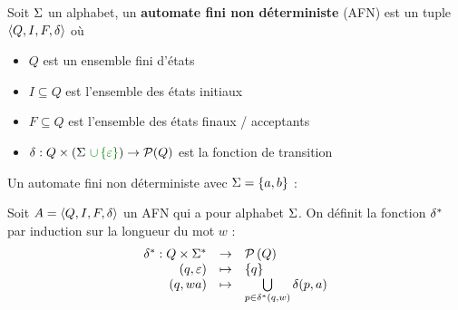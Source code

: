 \begin{definition}
	Soit $\Sigma$ un alphabet, un \textbf{automate fini non déterministe} (AFN) est un tuple $\langle Q, I, F, \delta \rangle$ où
	\begin{itemize}
		\item $Q$ est un ensemble fini d'états
		\item $I \subseteq Q$ est l'ensemble des états initiaux
		\item $F \subseteq Q$ est l'ensemble des états finaux / acceptants
		\item $\delta : Q \times (\alphabet \darkgreen {\ \cup \set\motvide}) \to \mathcal{P}(Q)$ est la fonction de transition
	\end{itemize}
\end{definition}


\begin{exemple}
	Un automate fini non déterministe avec $\Sigma = \left\{a, b\right\}$ :
	\begin{center}
		\begin{automata}

		\end{automata}
	\end{center}
\end{exemple}


\begin{definition}
	Soit $A = \langle Q, I, F, \delta \rangle$ un AFN qui a pour alphabet $\Sigma$. On définit la fonction $\delta^{*}$ par induction sur la longueur du mot $w$ :
	$$ \begin{array}{rcl}
			\delta^{*} : Q \times \Sigma^{*} & \to     & \mathcal{P}\left(Q\right)                                                  \\
			(q, \varepsilon)                   & \mapsto & \left\{q\right\}                                                    \\
			(q, wa)                         & \mapsto & \bigcup\limits_{p \in \delta^{*} (q, w)} \delta(p, a)
		\end{array} $$
\end{definition}


